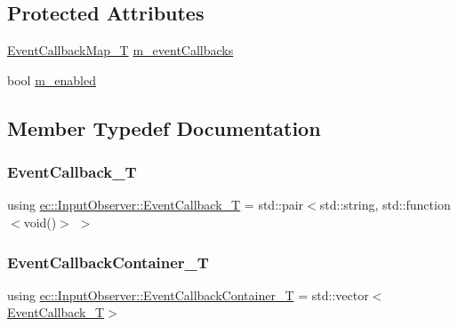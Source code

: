 \subsection*{Protected Attributes}
\begin{DoxyCompactItemize}
\item 
\mbox{\hyperlink{classec_1_1_input_observer_a1edd527067831ae67c3c929c32d62071}{Event\+Callback\+Map\+\_\+T}} \mbox{\hyperlink{classec_1_1_input_observer_a517f091edcec2f0827c174e980cb5237}{m\+\_\+event\+Callbacks}}
\item 
bool \mbox{\hyperlink{classec_1_1_input_observer_a97819a1193763cfd46b3d6286e66ab60}{m\+\_\+enabled}}
\end{DoxyCompactItemize}


\subsection{Member Typedef Documentation}
\mbox{\label{classec_1_1_input_observer_a4de594e1e65fb4f84e7ad3a70d593d21}} 
\subsubsection{\texorpdfstring{Event\+Callback\+\_\+T}{EventCallback\_T}}
{\footnotesize\ttfamily using \mbox{\hyperlink{classec_1_1_input_observer_a4de594e1e65fb4f84e7ad3a70d593d21}{ec\+::\+Input\+Observer\+::\+Event\+Callback\+\_\+T}} =  std\+::pair$<$std\+::string, std\+::function$<$void()$>$ $>$}

\mbox{\label{classec_1_1_input_observer_a4c09afb629f4cfa2cf769957431ebea0}} 
\subsubsection{\texorpdfstring{Event\+Callback\+Container\+\_\+T}{EventCallbackContainer\_T}}
{\footnotesize\ttfamily using \mbox{\hyperlink{classec_1_1_input_observer_a4c09afb629f4cfa2cf769957431ebea0}{ec\+::\+Input\+Observer\+::\+Event\+Callback\+Container\+\_\+T}} =  std\+::vector$<$\mbox{\hyperlink{classec_1_1_input_observer_a4de594e1e65fb4f84e7ad3a70d593d21}{Event\+Callback\+\_\+T}}$>$}

